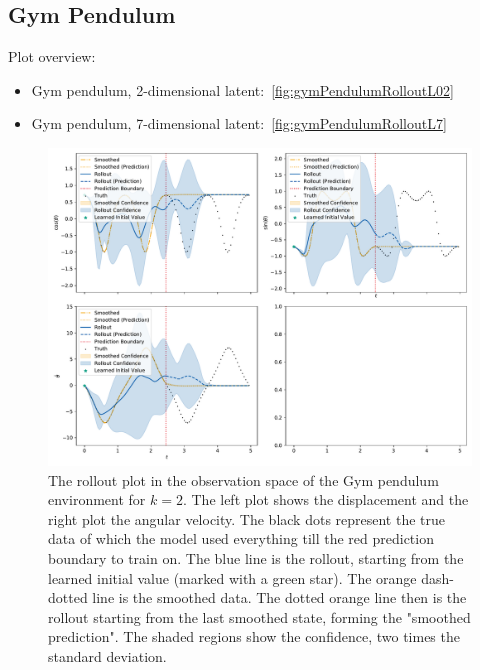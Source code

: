 	\subsection{Gym Pendulum}
		Plot overview:
		\begin{itemize}
			\item Gym pendulum, 2-dimensional latent:~\autoref{fig:gymPendulumRolloutL02}
			\item Gym pendulum, 7-dimensional latent:~\autoref{fig:gymPendulumRolloutL7}
		\end{itemize}

		\begin{figure}
			\centering
			\includegraphics[width=\linewidth]{figures/results/pendulum-gym/run-latent-dim-02/rollout-observations-N0.pdf}
			\caption[Rollout of the Gym pendulum experiment for 2 latent dimensions]{The rollout plot in the observation space of the Gym pendulum environment for \(k = 2\). The left plot shows the displacement and the right plot the angular velocity. The black dots represent the true data of which the model used everything till the red prediction boundary to train on. The blue line is the rollout, starting from the learned initial value (marked with a green star). The orange dash-dotted line is the smoothed data. The dotted orange line then is the rollout starting from the last smoothed state, forming the "smoothed prediction". The shaded regions show the confidence, \ie two times the standard deviation.}
			\label{fig:gymPendulumRolloutL02}
		\end{figure}

